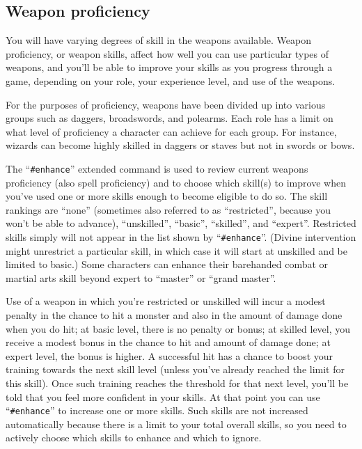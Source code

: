 \subsection*{Weapon proficiency}

You will have varying degrees of skill in the weapons available.
Weapon proficiency, or weapon skills, affect how well you can use
particular types of weapons, and you'll be able to improve your skills
as you progress through a game, depending on your role, your experience
level, and use of the weapons.

For the purposes of proficiency, weapons have
been divided up into various groups such as daggers, broadswords, and
polearms.  Each role has a limit on what level of proficiency a character
can achieve for each group.  For instance, wizards can become highly
skilled in daggers or staves but not in swords or bows.

The ``{\tt \#enhance}'' extended command is used to review current weapons
proficiency
(also spell proficiency) and to choose which skill(s) to improve when
you've used one or more skills enough to become eligible to do so.  The
skill rankings are ``none'' (sometimes also referred to as ``restricted'',
because you won't be able to advance), ``unskilled'', ``basic'', ``skilled'',
and ``expert''.  Restricted skills simply will not appear in the list
shown by ``{\tt \#enhance}''.
(Divine intervention might unrestrict a particular
skill, in which case it will start at unskilled and be limited to basic.)
Some characters can enhance their barehanded combat or martial arts skill
beyond expert to ``master'' or ``grand master''.

Use of a weapon in which you're restricted or unskilled
will incur a modest penalty in the chance to hit a monster and also in
the amount of damage done when you do hit; at basic level, there is no
penalty or bonus; at skilled level, you receive a modest bonus in the
chance to hit and amount of damage done; at expert level, the bonus is
higher.  A successful hit has a chance to boost your training towards
the next skill level (unless you've already reached the limit for this
skill).  Once such training reaches the threshold for that next level,
you'll be told that you feel more confident in your skills.  At that
point you can use ``{\tt \#enhance}'' to increase one or more skills.
Such skills
are not increased automatically because there is a limit to your total
overall skills, so you need to actively choose which skills to enhance
and which to ignore.

